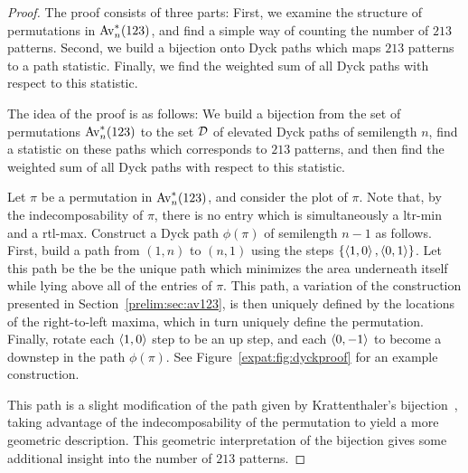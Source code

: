    \begin{proof}
      The proof consists of three parts: First, we examine the structure of
      permutations in $\operatorname{{Av}}_n^*(123)$, and find a simple way of counting the number of
      $213$ patterns. Second, we build a bijection onto Dyck paths which maps
      $213$ patterns to a path statistic. Finally, we find the weighted sum of
      all Dyck paths with respect to this statistic.

      The idea of the proof is as follows: We build a bijection from the set of
      permutations $\operatorname{{Av}}_n^*(123)$ to the set $\mathcal{D}$ of elevated Dyck paths of semilength
      $n$, find a statistic on these paths which corresponds to $213$ patterns,
      and then find the weighted sum of all Dyck paths with respect to this
      statistic.

      Let $\pi$ be a permutation in $\operatorname{{Av}}_n^*(123)$, and consider the plot of $\pi$.
      Note that, by the indecomposability of $\pi$, there is no entry which is
      simultaneously a ltr-min and a rtl-max. Construct a Dyck path $\phi(\pi)$
      of semilength $n-1$ as follows. First, build a path from $(1,n)$ to
      $(n,1)$ using the steps $\{\left\langle 1,0 \right\rangle, \left\langle 0,1 \right\rangle \}$. Let this path be
      the be the unique path which minimizes the area underneath itself while
      lying above all of the entries of $\pi$. This path, a variation of the
      construction presented in Section~\ref{prelim:sec:av123}, is then
      uniquely defined by the locations of the right-to-left maxima, which in
      turn uniquely define the permutation. Finally, rotate each $\left\langle 1,0 \right\rangle$
      step to be an up step, and each $\left\langle 0,-1 \right\rangle$ to become a downstep in
      the path $\phi(\pi)$. See Figure~\ref{expat:fig:dyckproof} for an example
      construction. 
      
      This path is a slight modification of the path given by Krattenthaler's
      bijection~\cite{Krattenthaler2001}, taking advantage of the
      indecomposability of the permutation to yield a more geometric description.
      This geometric interpretation of the bijection gives some additional
      insight into the number of $213$ patterns. 




\end{proof}
